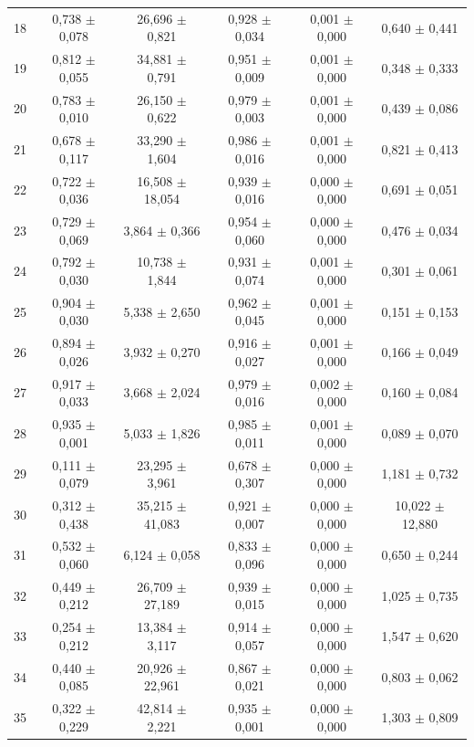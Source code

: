 \begin{tabular}{l c c c c c}
18 & 0,738 $\pm$ 0,078 & 26,696 $\pm$ 0,821 & 0,928 $\pm$ 0,034 & 0,001 $\pm$ 0,000 & 0,640 $\pm$ 0,441 \\
19 & 0,812 $\pm$ 0,055 & 34,881 $\pm$ 0,791 & 0,951 $\pm$ 0,009 & 0,001 $\pm$ 0,000 & 0,348 $\pm$ 0,333 \\
20 & 0,783 $\pm$ 0,010 & 26,150 $\pm$ 0,622 & 0,979 $\pm$ 0,003 & 0,001 $\pm$ 0,000 & 0,439 $\pm$ 0,086 \\
21 & 0,678 $\pm$ 0,117 & 33,290 $\pm$ 1,604 & 0,986 $\pm$ 0,016 & 0,001 $\pm$ 0,000 & 0,821 $\pm$ 0,413 \\
22 & 0,722 $\pm$ 0,036 & 16,508 $\pm$ 18,054 & 0,939 $\pm$ 0,016 & 0,000 $\pm$ 0,000 & 0,691 $\pm$ 0,051 \\
23 & 0,729 $\pm$ 0,069 & 3,864 $\pm$ 0,366 & 0,954 $\pm$ 0,060 & 0,000 $\pm$ 0,000 & 0,476 $\pm$ 0,034 \\
24 & 0,792 $\pm$ 0,030 & 10,738 $\pm$ 1,844 & 0,931 $\pm$ 0,074 & 0,001 $\pm$ 0,000 & 0,301 $\pm$ 0,061 \\
25 & 0,904 $\pm$ 0,030 & 5,338 $\pm$ 2,650 & 0,962 $\pm$ 0,045 & 0,001 $\pm$ 0,000 & 0,151 $\pm$ 0,153 \\
26 & 0,894 $\pm$ 0,026 & 3,932 $\pm$ 0,270 & 0,916 $\pm$ 0,027 & 0,001 $\pm$ 0,000 & 0,166 $\pm$ 0,049 \\
27 & 0,917 $\pm$ 0,033 & 3,668 $\pm$ 2,024 & 0,979 $\pm$ 0,016 & 0,002 $\pm$ 0,000 & 0,160 $\pm$ 0,084 \\
28 & 0,935 $\pm$ 0,001 & 5,033 $\pm$ 1,826 & 0,985 $\pm$ 0,011 & 0,001 $\pm$ 0,000 & 0,089 $\pm$ 0,070 \\
29 & 0,111 $\pm$ 0,079 & 23,295 $\pm$ 3,961 & 0,678 $\pm$ 0,307 & 0,000 $\pm$ 0,000 & 1,181 $\pm$ 0,732 \\
30 & 0,312 $\pm$ 0,438 & 35,215 $\pm$ 41,083 & 0,921 $\pm$ 0,007 & 0,000 $\pm$ 0,000 & 10,022 $\pm$ 12,880 \\
31 & 0,532 $\pm$ 0,060 & 6,124 $\pm$ 0,058 & 0,833 $\pm$ 0,096 & 0,000 $\pm$ 0,000 & 0,650 $\pm$ 0,244 \\
32 & 0,449 $\pm$ 0,212 & 26,709 $\pm$ 27,189 & 0,939 $\pm$ 0,015 & 0,000 $\pm$ 0,000 & 1,025 $\pm$ 0,735 \\
33 & 0,254 $\pm$ 0,212 & 13,384 $\pm$ 3,117 & 0,914 $\pm$ 0,057 & 0,000 $\pm$ 0,000 & 1,547 $\pm$ 0,620 \\
34 & 0,440 $\pm$ 0,085 & 20,926 $\pm$ 22,961 & 0,867 $\pm$ 0,021 & 0,000 $\pm$ 0,000 & 0,803 $\pm$ 0,062 \\
35 & 0,322 $\pm$ 0,229 & 42,814 $\pm$ 2,221 & 0,935 $\pm$ 0,001 & 0,000 $\pm$ 0,000 & 1,303 $\pm$ 0,809 \\

\end{tabular}
